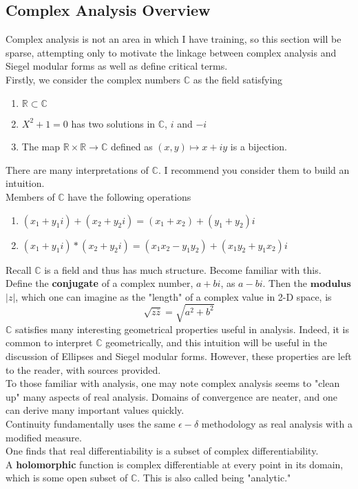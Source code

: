 \documentclass[11pt, oneside]{amsart}
\begin{document}
\subsection{Complex Analysis Overview}
Complex analysis is not an area in which I have training, so this section will be sparse, attempting only to motivate the linkage between complex analysis and Siegel modular forms as well as define critical terms.\\
Firstly, we consider the complex numbers $\mathbb{C}$ as the field satisfying
\begin{enumerate}
\item $\mathbb{R} \subset \mathbb{C}$
\item $X^2+1=0$ has two solutions in $\mathbb{C}$, $i$ and $-i$
\item The map $\mathbb{R}\times \mathbb{R} \rightarrow \mathbb{C}$ defined as $(x,y)\mapsto x+iy$ is a bijection.
\end{enumerate}
There are many interpretations of $\mathbb{C}$. I recommend you consider them to build an intuition.\\
Members of $\mathbb{C}$ have the following operations
\begin{enumerate}
\item $(x_1+y_1i) + (x_2+y_2i) = (x_1+x_2) + (y_1+y_2)i$
\item $(x_1+y_1i)*(x_2+y_2i)=(x_1x_2-y_1y_2)+(x_1y_2+y_1x_2)i$
\end{enumerate}
Recall $\mathbb{C}$ is a field and thus has much structure. Become familiar with this.\\

Define the \textbf{conjugate} of a complex number, $a+bi$, as $a-bi$. Then the $\textbf{modulus}$ $\vert z \vert$, which one can imagine as the "length" of a complex value in 2-D space, is $$\sqrt{z\bar{z}}= \sqrt{a^2+b^2}$$
$\mathbb{C}$ satisfies many interesting geometrical properties useful in analysis. Indeed, it is common to interpret $\mathbb{C}$ geometrically, and this intuition will be useful in the discussion of Ellipses and Siegel modular forms. However, these properties are left to the reader, with sources provided.\\
To those familiar with analysis, one may note complex analysis seems to "clean up" many aspects of real analysis. Domains of convergence are neater, and one can derive many important values quickly.\\

Continuity fundamentally uses the same $\epsilon-\delta$ methodology as real analysis with a modified measure.\\
One finds that real differentiability is a subset of complex differentiability.\\
A\textbf{ holomorphic} function is complex differentiable at every point in its domain, which is some open subset of $\mathbb{C}$. This is also called being "analytic."\\
\end{document}
